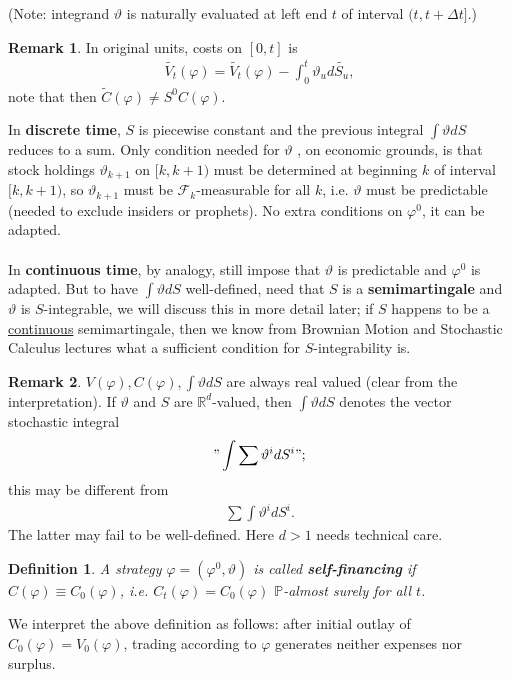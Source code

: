 \documentclass[12pt,a4paper, twoside]{article}
\newtheorem{defn}{Definition}[section]
\theoremstyle{definition}
\newtheorem{rem}{Remark}[section]
\begin{document}
(Note: integrand $\vartheta$ is naturally evaluated at left end $t$ of interval $(t, t + \Delta t]$.)
\newpage
\begin{rem} In original units, costs on $[0,t]$ is 
\begin{align*}
\widetilde{V_t}( \varphi) = \widetilde{V_t}( \varphi) - \int_0^t  \vartheta_u d \widetilde{S_u},
\end{align*}
note that then $\widetilde{C}( \varphi) \neq S^0 C( \varphi)$. 
\end{rem}
In \textbf{discrete time}, $S$ is piecewise constant and the previous integral $\int \vartheta d S$ reduces to a sum. Only condition needed for $\vartheta$ , on economic grounds, is that stock holdings $\vartheta_{k+1}$ on $[k,k+1)$ must be determined at beginning $k$ of interval $[k,k+1)$, so $\vartheta_{k+1}$ must be $\mathcal{F}_k$-measurable for all $k$,  i.e. $\vartheta$ must be predictable (needed to exclude insiders or prophets). No extra conditions on $\varphi^0$, it can be adapted. 
\\\\
In \textbf{continuous time}, by analogy,  still impose that $\vartheta$ is predictable and $\varphi^0$ is adapted. But to have $\int \vartheta d S$ well-defined, need that $S$ is a \textbf{semimartingale} and $\vartheta$ is $S$-integrable, we will discuss this in more detail later; if $S$ happens to be a \underline{continuous} semimartingale, then we know from Brownian Motion and Stochastic Calculus lectures what a sufficient condition for $S$-integrability is. 
\begin{rem} $V( \varphi), C( \varphi), \int \vartheta dS$ are always real valued (clear from the interpretation). If $\vartheta$ and $S$ are $\mathbb{R}^d$-valued, then $\int \vartheta dS$ denotes the vector stochastic integral 
\begin{align*}
" \int \sum \vartheta^i dS^i ";
\end{align*}
this may be different from 
\begin{align*}
\sum \int \vartheta^i d S^i. 
\end{align*}
The latter may fail to be well-defined. Here $d>1$ needs technical care. 
\end{rem}
\begin{defn} A strategy $\varphi = ( \varphi^0, \vartheta)$ is called \textbf{self-financing} if $C( \varphi)\equiv C_0( \varphi)$, i.e. $C_t( \varphi) = C_0( \varphi)$ $\mathbb{P}$-almost surely for all $t$. 
\end{defn}
We interpret the above definition as follows: after initial outlay of $C_0( \varphi)= V_0( \varphi)$, trading according to $\varphi$ generates neither expenses nor surplus. 
\end{document}
